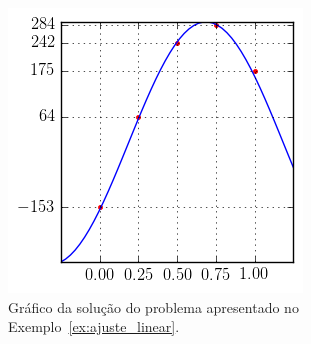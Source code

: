 \begin{sol}
\end{sol}

\begin{figure}
  \centering
  \includegraphics{cap_ajuste/pics/ex_ajuste_linear/ex_ajuste_linear}
  \caption{Gráfico da solução do problema apresentado no Exemplo~\ref{ex:ajuste_linear}.}
  \label{fig:ex_ajuste_linear}
\end{figure}


